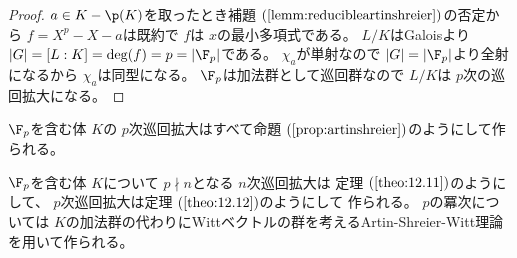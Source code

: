 \documentclass[../master_galois_theory]{subfiles}
\begin{document}
\begin{proof}
  $a \in K - \p(K)$を取ったとき補題 $(\mathrm{\ref{lemm:reducibleartinshreier}})$の否定から
  $f = X^p - X - a$は既約で $f$は $x$の最小多項式である。
  $L/K$は\rm{Galois}より $|G| = [L:K] = \deg(f) = p = |\F_p|$である。
  $\chi_a$が単射なので $|G| = |\F_p|$より全射になるから
  $\chi_a$は同型になる。
  $\F_p$は加法群として巡回群なので $L/K$は $p$次の巡回拡大になる。
\end{proof}

\begin{theo} \label{theo:12.12}
  $\F_p$を含む体 $K$の $p$次巡回拡大はすべて命題 $(\mathrm{\ref{prop:artinshreier}})$のようにして作られる。
\end{theo}

\begin{fact}
  $\F_p$を含む体 $K$について $p \nmid n$となる $n$次巡回拡大は
  定理 $(\mathrm{\ref{theo:12.11}})$のようにして、
  $p$次巡回拡大は定理 $(\mathrm{\ref{theo:12.12}})$のようにして
  作られる。
  $p$の冪次については $K$の加法群の代わりに\rm{Witt}ベクトルの群を考える\rm{Artin-Shreier-Witt}理論を用いて作られる。
\end{fact}

\clearpage
\end{document}
